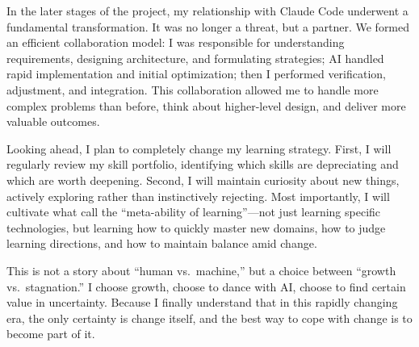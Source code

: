 \documentclass[12pt,a4paper]{article}
\begin{document}
In the later stages of the project, my relationship with Claude Code underwent a fundamental transformation. It was no longer a threat, but a partner. We formed an efficient collaboration model: I was responsible for understanding requirements, designing architecture, and formulating strategies; AI handled rapid implementation and initial optimization; then I performed verification, adjustment, and integration. This collaboration allowed me to handle more complex problems than before, think about higher-level design, and deliver more valuable outcomes.

Looking ahead, I plan to completely change my learning strategy. First, I will regularly review my skill portfolio, identifying which skills are depreciating and which are worth deepening. Second, I will maintain curiosity about new things, actively exploring rather than instinctively rejecting. Most importantly, I will cultivate what \citet{ra2019technology} call the ``meta-ability of learning''---not just learning specific technologies, but learning how to quickly master new domains, how to judge learning directions, and how to maintain balance amid change.

This is not a story about ``human vs.\ machine,'' but a choice between ``growth vs.\ stagnation.'' I choose growth, choose to dance with AI, choose to find certain value in uncertainty. Because I finally understand that in this rapidly changing era, the only certainty is change itself, and the best way to cope with change is to become part of it.



\end{document}
